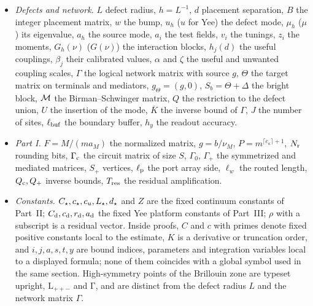 \begin{itemize}
energy, $H=\tfrac12\lambda''(k_*)$ the Hessian ($H_0$ its leading-order value),
$\Phi_q$ Bloch cell functions, $\chi$ the momentum cutoff, $R_\sigma$ the
auxiliary resolvent, $q_0$ the chart radius, $k_\parallel,k_\perp$ ($q_\parallel,q_\perp$ for Yee) the
longitudinal and transverse momentum components in the pole analysis.
\item \emph{Defects and network.} $L$ defect radius, $h=L^{-1}$, $d$ placement
separation, $B$ the integer placement matrix, $w$ the bump, $u_h$ ($u$ for Yee)
the defect mode, $\mu_h$ ($\mu$) its eigenvalue, $a_h$ the source mode, $a_i$
the test fields, $v_i$ the tunings, $z_i$ the moments, $G_h(\nu)$ ($G(\nu)$)
the interaction blocks, $h_j(d)$ the useful couplings, $\beta_j$ their
calibrated values, $\alpha$ and $\zeta$ the useful and unwanted coupling
scales, $\Gamma$ the logical network matrix with source $g$,
$\Theta$ the target matrix on terminals and mediators, $g_\Theta=(g,0)$,
$S_b=\Theta+\Delta$ the bright block, $\mathcal M$ the Birman--Schwinger matrix, $Q$ the
restriction to the defect union, $U$ the insertion of the mode, $\overline K$
the inverse bound of $\Gamma$, $J$ the number of sites, $\ell_{\rm buf}$ the
boundary buffer, $h_y$ the readout accuracy.
\item \emph{Part I.} $F=M/(ma_M)$ the normalized matrix, $g=b/\nu_M$, $P=m^{\lceil c_\kappa\rceil+1}$,
$N_{\rm r}$ rounding bits, $\Gamma_{\rm c}$ the circuit matrix of size $S$,
$\Gamma_0$, $\Gamma_+$ the symmetrized and mediated matrices, $S_+$ vertices,
$\ell_{\rm p}$ the port array side, $\ell_w$ the routed length, $Q_{\rm c},Q_+$
inverse bounds, $T_{\rm res}$ the residual amplification.
\item \emph{Constants.} $C_\star,c_\star,c_u,L_\star,d_\star$ and $Z$ are the fixed
continuum constants of Part~II; $C_{\rm d},c_{\rm d},r_{\rm d},a_{\rm d}$ the fixed
Yee platform constants of Part~III; $\rho$ with a subscript is a residual
vector. Inside proofs, $C$ and $c$ with primes denote fixed positive constants
local to the estimate, $K$ is a derivative or truncation order, and $i,j,a,s,t,y$
are bound indices, parameters and integration variables local to a displayed
formula; none of them coincides with a global symbol used in the same section.
High-symmetry points of the Brillouin zone are typeset upright,
$\mathrm{L}_{++-}$ and $\mathrm{\Gamma}$, and are distinct from the defect radius
$L$ and the network matrix $\Gamma$.
\end{itemize}

